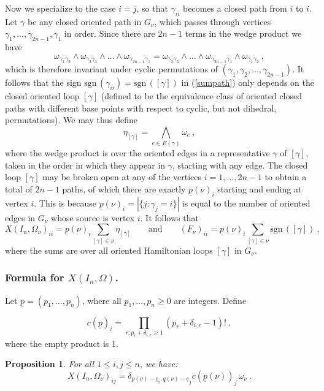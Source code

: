 \documentclass[10pt]{amsart}
\newcommand{\pp}{{\underline{p}}}
\newcommand{\qq}{{\underline{q}}}
\newcommand{\eee}{{\underline{e}}}
\newcommand{\sgn}{\mathrm{sgn}\,}
\theoremstyle{plain}
\newtheorem{prop}[thm]{Proposition}
\newcommand{\0}{\color{blue}{\mathsf{0}}}
\begin{document}
Now we specialize to the case $i=j$, so that  $\gamma_{ii}$ becomes a closed
path from $i$ to $i$.
Let $\gamma$ be any closed oriented path in $G_{\nu}$, which passes through vertices $\gamma_1,\ldots, \gamma_{2n-1},\gamma_1$ in order. Since there are $2n-1$ terms in the wedge product we have
\[   \omega_{\gamma_1 \gamma_2}  \wedge   \omega_{\gamma_2 \gamma_3} \wedge \ldots \wedge \omega_{\gamma_{2n-1} \gamma_{1}} =    \omega_{\gamma_2 \gamma_3}  \wedge \ldots \wedge \omega_{\gamma_{2n-1} \gamma_{1}} \wedge \omega_{\gamma_1 \gamma_2}\ ,\]
which is therefore invariant under cyclic permutations of  $(\gamma_1, \gamma_2, \ldots, \gamma_{2n-1})$.  It follows that the sign $\sgn(\gamma_{ii})=\sgn([\gamma])$ in (\ref{sumpath}) only depends on the closed oriented loop  $[\gamma]$  (defined to be the equivalence class of oriented closed paths with different base points with respect to cyclic, but not dihedral, permutations). 
We may thus define
\[ \eta_{[\gamma]} = \bigwedge_{e\in E(\gamma)}  \omega_{e}\ ,\]
where the wedge product is over the oriented edges in a representative $\gamma$ of $[\gamma]$, taken in the order in which they appear in $\gamma$, starting with any edge.
The closed loop  $[\gamma]$ may be broken open at any of the vertices $i=1,\ldots, 2n-1$ to obtain a total of $2n-1$ paths, of which there are exactly $\pp(\nu)_i$ starting  and ending at vertex $i$. This is because $\pp(\nu)_i=|\{j: \gamma_j=i\}|$ is equal to the number of oriented edges in $G_{\nu}$ whose source is vertex $i$. 
It follows that
\begin{equation}\label{eq: HamCyc}
X(I_n,\Omega_\nu)_{ii}=\pp(\nu)_i\sum_{[\gamma]\in\nu}\eta_{[\gamma]}\qquad\text{and}\qquad 
(F_\nu)_{ii}=\pp(\nu)_i\sum_{[\gamma]\in\nu}\sgn([\gamma])\ ,
\end{equation}
where the sums are over all oriented Hamiltonian loops $[\gamma]$ in $G_{\nu}$. 
\subsubsection{Formula for $X(I_n, \Omega)$.}
Let $\pp=(p_1,\ldots, p_n)$, where all $p_1,\ldots, p_n\geq 0 $ are integers.  Define

\begin{equation}\label{cdef}
c(\pp)_i=\prod_{r:p_r+\delta_{i,r}\geq1}(p_r+\delta_{i,r}-1)!\ ,
\end{equation}
where the empty product is 1.

\begin{prop} \label{prop: Xid}
For all $1\leq i, j\leq n$, we have:
\begin{equation}\label{eq: Xid}
   X(I_n,\Omega_\nu)_{ij}= \delta_{\pp(\nu)-\eee_i,\qq(\nu)-\eee_j}c(\pp(\nu))_j \, \omega_{\nu}\ .
\end{equation}
\end{prop}
\end{document}
